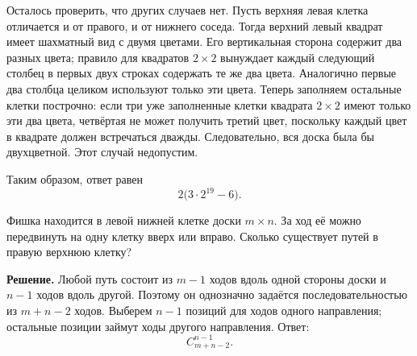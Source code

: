 \begin{problems}
\par Осталось проверить, что других случаев нет. Пусть верхняя левая клетка отличается и от правого, и от нижнего соседа. Тогда верхний левый квадрат имеет шахматный вид с двумя цветами. Его вертикальная сторона содержит два разных цвета; правило для квадратов $2\times2$ вынуждает каждый следующий столбец в первых двух строках содержать те же два цвета. Аналогично первые два столбца целиком используют только эти цвета. Теперь заполняем остальные клетки построчно: если три уже заполненные клетки квадрата $2\times2$ имеют только эти два цвета, четвёртая не может получить третий цвет, поскольку каждый цвет в квадрате должен встречаться дважды. Следовательно, вся доска была бы двухцветной. Этот случай недопустим.
\par Таким образом, ответ равен
\[
\boxed{2\bigl(3\cdot2^{19}-6\bigr)}.
\]\par

\item Фишка находится в левой нижней клетке доски $m\times n$. За ход её можно передвинуть на одну клетку вверх или вправо. Сколько существует путей в правую верхнюю клетку?
\par\smallskip\noindent\textbf{Решение.} Любой путь состоит из $m-1$ ходов вдоль одной стороны доски и $n-1$ ходов вдоль другой. Поэтому он однозначно задаётся последовательностью из $m+n-2$ ходов. Выберем $n-1$ позиций для ходов одного направления; остальные позиции займут ходы другого направления. Ответ:
\[
C_{m+n-2}^{n-1}.
\]\par


\end{problems}
